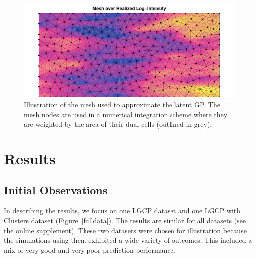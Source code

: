 \documentclass[review]{elsarticle}
\begin{document}
\begin{figure}
\includegraphics[width=5in]{../graphics/mesh-LGCP000004.pdf}
\caption{Illustration of the mesh used to approximate the latent GP. The mesh
nodes are used in a numerical integration scheme where they are weighted by the
area of their dual cells (outlined in grey).}
\label{meshfull}
\end{figure}




\section{Results}

\subsection{Initial Observations}

In describing the results, we focus on one LGCP dataset and one LGCP with
Clusters dataset (Figure~\ref{fulldata}). The results are similar for all
datasets (see the online supplement). These two datasets were chosen for
illustration because the simulations using them exhibited a wide variety of
outcomes. This included a mix of very good and very poor prediction
performance.
\end{document}
